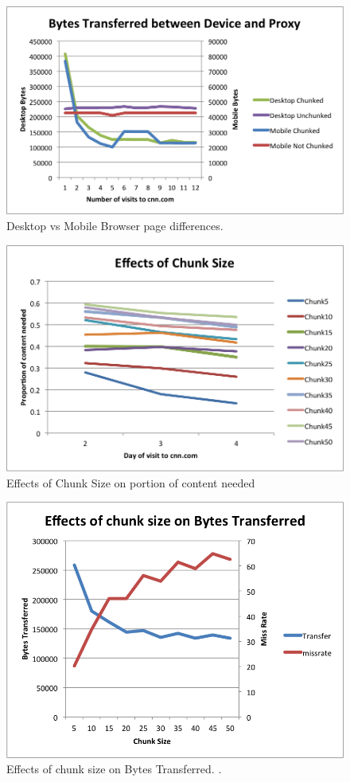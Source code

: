 \begin{figure}[h] 
\centering \includegraphics[scale=0.40]{images/desktopmobile.png}
\caption{Desktop vs Mobile Browser page differences.}
\end{figure}

\begin{figure}[h] 
\centering \includegraphics[scale=0.40]{images/chunksize.png}
\caption{Effects of Chunk Size on portion of content needed}
\end{figure}

\begin{figure}[h] 
\centering \includegraphics[scale=0.40]{images/chunksize2.png}
\caption{Effects of chunk size on Bytes Transferred. .}
\end{figure}

